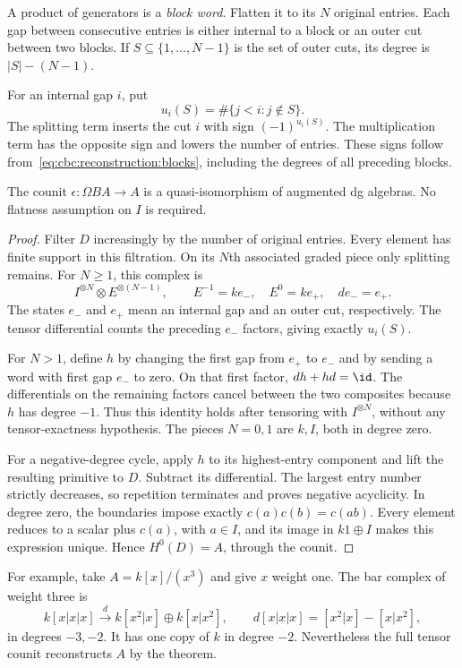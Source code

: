 A product of generators is a \emph{block word}.
Flatten it to its $N$ original entries.
Each gap between consecutive entries is either internal to a block or an outer cut between two blocks.
If $S\subseteq\{1,\ldots,N-1\}$ is the set of outer cuts, its degree is $|S|-(N-1)$.

For an internal gap $i$, put
\[
 u_i(S)=\#\{j<i:j\notin S\}.
\]
The splitting term inserts the cut $i$ with sign $(-1)^{u_i(S)}$.
The multiplication term has the opposite sign and lowers the number of entries.
These signs follow from~\eqref{eq:cbc:reconstruction:blocks}, including the degrees of all preceding blocks.

\begin{theorem}\label{cbc:reconstruction:ordinary}
The counit $\epsilon:\Omega BA\to A$ is a quasi-isomorphism of augmented dg algebras.
No flatness assumption on $I$ is required.
\end{theorem}
\begin{proof}
Filter $D$ increasingly by the number of original entries.
Every element has finite support in this filtration.
On its $N$th associated graded piece only splitting remains.
For $N\geq1$, this complex is
\[
 I^{\otimes N}\otimes E^{\otimes(N-1)},\qquad
 E^{-1}=ke_-,\quad E^0=ke_+,\quad de_-=e_+.
\]
The states $e_-$ and $e_+$ mean an internal gap and an outer cut, respectively.
The tensor differential counts the preceding $e_-$ factors, giving exactly $u_i(S)$.

For $N>1$, define $h$ by changing the first gap from $e_+$ to $e_-$ and by sending a word with first gap $e_-$ to zero.
On that first factor, $dh+hd=\id$.
The differentials on the remaining factors cancel between the two composites because $h$ has degree $-1$.
Thus this identity holds after tensoring with $I^{\otimes N}$, without any tensor-exactness hypothesis.
The pieces $N=0,1$ are $k,I$, both in degree zero.

For a negative-degree cycle, apply $h$ to its highest-entry component and lift the resulting primitive to $D$.
Subtract its differential.
The largest entry number strictly decreases, so repetition terminates and proves negative acyclicity.
In degree zero, the boundaries impose exactly $c(a)c(b)=c(ab)$.
Every element reduces to a scalar plus $c(a)$, with $a\in I$, and its image in $k1\oplus I$ makes this expression unique.
Hence $H^0(D)=A$, through the counit.
\end{proof}

For example, take $A=k[x]/(x^3)$ and give $x$ weight one.
The bar complex of weight three is
\[
 k[x|x|x]\xrightarrow{\ d\ }
 k[x^2|x]\oplus k[x|x^2],\qquad
 d[x|x|x]=[x^2|x]-[x|x^2],
\]
in degrees $-3,-2$.
It has one copy of $k$ in degree $-2$.
Nevertheless the full tensor counit reconstructs $A$ by the theorem.

